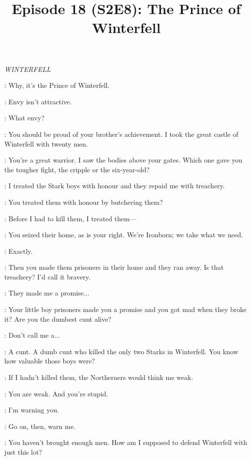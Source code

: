 

\title{Episode 18 (S2E8): The Prince of Winterfell}
\author{}
\date{}
\maketitle



\scene

\textit{WINTERFELL} 


\YARA: Why, it's the Prince of Winterfell. 

\THEON: Envy isn't attractive. 

\YARA: What envy? 

\THEON: You should be proud of your brother's achievement. I took the great castle of Winterfell with twenty men. 

\YARA: You're a great warrior. I saw the bodies above your gates. Which one gave you the tougher fight, the cripple or the six-year-old? 

\THEON: I treated the Stark boys with honour and they repaid me with treachery. 

\YARA: You treated them with honour by butchering them? 

\THEON: Before I had to kill them, I treated them---

\YARA: You seized their home, as is your right. We're Ironborn; we take what we need. 

\THEON: Exactly. 

\YARA: Then you made them prisoners in their home and they ran away. Is that treachery? I'd call it bravery. 

\THEON: They made me a promise$\ldots$  

\YARA: Your little boy prisoners made you a promise and you got mad when they broke it? Are you the dumbest cunt alive? 

\THEON: Don't call me a$\ldots$  

\YARA: A cunt. A dumb cunt who killed the only two Starks in Winterfell. You know how valuable those boys were? 

\THEON: If I hadn't killed them, the Northerners would think me weak. 

\YARA: You are weak. And you're stupid. 

\THEON: I'm warning you. 

\YARA: Go on, then, warn me. 

\THEON: You haven't brought enough men. How am I supposed to defend Winterfell with just this lot? 

